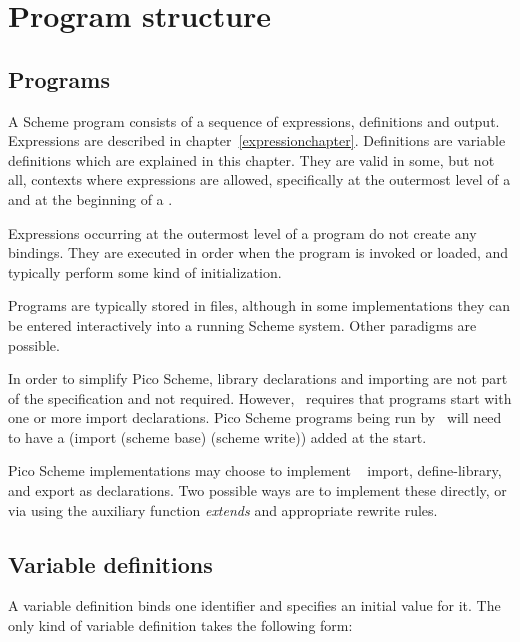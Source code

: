 \chapter{Program structure}
\label{programchapter}

\section{Programs}

A Scheme program consists of a sequence of
expressions, definitions and output.
Expressions are described in chapter~\ref{expressionchapter}.
Definitions are variable definitions which are explained in this chapter.
They are valid in some, but not all, contexts where expressions
are allowed, specifically at the outermost level of a 
and at the beginning of a .

Expressions occurring at the outermost level of a program
do not create any bindings.  They are
executed in order when the program is
invoked or loaded, and typically perform some kind of initialization.

Programs are typically stored in files, although
in some implementations they can be entered interactively into a running
Scheme system.  Other paradigms are possible.

\begin{rationale}
  In order to simplify Pico Scheme, library declarations and importing
  are not part of the specification and not required.  However,
  \rsevenrs\ requires that programs start with one or more import
  declarations. Pico Scheme programs being run by \rsevenrs\ will need
  to have a {\cf (import (scheme base) (scheme write))} added at the
  start.

  Pico Scheme implementations may choose to implement \rsevenrs\ {\cf
    import}, {\cf define-library}, and {\cf export} as declarations.
  Two possible ways are to implement these directly, or via using the
  auxiliary function {\it extends} and appropriate rewrite rules.
\end{rationale}

\section{Variable definitions}
\label{defines}

A variable definition binds one identifier and specifies an initial
value for it.
The only kind of variable definition
takes the following form:

